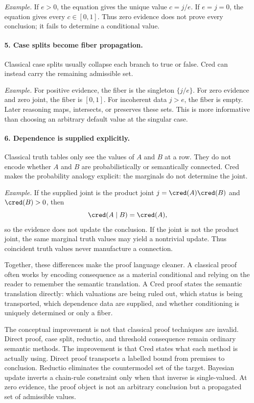 \emph{Example.}  If $e>0$, the equation gives the unique value
$c=j/e$.  If $e=j=0$, the equation gives every $c\in[0,1]$.  Thus zero
evidence does not prove every conclusion; it fails to determine a
conditional value.

\paragraph{5. Case splits become fiber propagation.}
Classical case splits usually collapse each branch to true or false.
Cred can instead carry the remaining admissible set.

\emph{Example.}  For positive evidence, the fiber is the singleton
$\{j/e\}$.  For zero evidence and zero joint, the fiber is $[0,1]$.
For incoherent data $j>e$, the fiber is empty.  Later reasoning maps,
intersects, or preserves these sets.  This is more informative than
choosing an arbitrary default value at the singular case.

\paragraph{6. Dependence is supplied explicitly.}
Classical truth tables only see the values of $A$ and $B$ at a row.
They do not encode whether $A$ and $B$ are probabilistically or
semantically connected.  Cred makes the probability analogy explicit:
the marginals do not determine the joint.

\emph{Example.}  If the supplied joint is the product joint
$j=\cred(A)\cred(B)$ and $\cred(B)>0$, then
\[
  \cred(A\mid B)=\cred(A),
\]
so the evidence does not update the conclusion.  If the joint is not
the product joint, the same marginal truth values may yield a nontrivial
update.  Thus coincident truth values never manufacture a connection.

Together, these differences make the proof language cleaner.  A
classical proof often works by encoding consequence as a material
conditional and relying on the reader to remember the semantic
translation.  A Cred proof states the semantic translation directly:
which valuations are being ruled out, which status is being transported,
which dependence data are supplied, and whether conditioning is uniquely
determined or only a fiber.

The conceptual improvement is not that classical proof techniques are
invalid.  Direct proof, case split, reductio, and threshold consequence
remain ordinary semantic methods.  The improvement is that Cred states
what each method is actually using.  Direct proof transports a labelled
bound from premises to conclusion.  Reductio eliminates the
countermodel set of the target.  Bayesian update inverts a chain-rule
constraint only when that inverse is single-valued.  At zero evidence,
the proof object is not an arbitrary conclusion but a propagated set of
admissible values.

